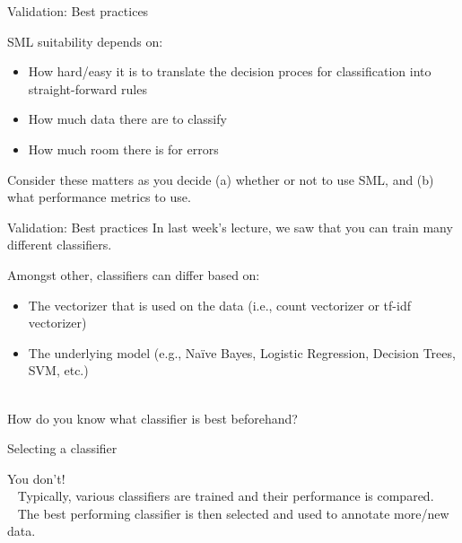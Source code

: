\documentclass[compress]{beamer}
\begin{document}
\begin{frame}{Validation: Best practices}

\begin{alertblock}{SML suitability depends on:}
\begin{itemize}
	\item How hard/easy it is to translate the decision proces for classification into straight-forward rules
	\item How much data there are to classify
	\item How much room there is for errors 
\end{itemize}
\end{alertblock}
Consider these matters as you decide (a) whether or not to use SML, and (b) what performance metrics to use.
\end{frame}


\begin{frame}{Validation: Best practices}
In last week's lecture, we saw that you can train many different classifiers.  

\begin{alertblock}{Amongst other, classifiers can differ based on:}
	\begin{itemize}
		\item The vectorizer that is used on the data (i.e., count vectorizer or tf-idf vectorizer)
		\item The underlying model (e.g., Naïve Bayes, Logistic Regression, Decision Trees, SVM, etc.)\\\
	\end{itemize}
\end{alertblock}
\pause
How do you know what classifier is best beforehand?
\end{frame}


\begin{frame}{Selecting a classifier}

You don't!\\\
\pause
Typically, various classifiers are trained and their performance is compared.\\\
\pause
The best performing classifier is then selected and used to annotate more/new data.
\end{frame}
\end{document}
